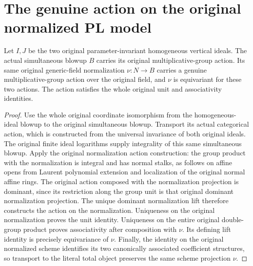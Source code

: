 \section{The genuine action on the original normalized PL model}

\begin{theorem}
\label{thm:pl-original-normalized-simultaneous-gm-action}
\leanok
Let $I,J$ be the two original parameter-invariant homogeneous vertical ideals.
The actual simultaneous blowup $B$ carries its original multiplicative-group
action. Its same original generic-field normalization $\nu:N\to B$ carries a
genuine multiplicative-group action over the original field, and $\nu$ is
equivariant for these two actions. The action satisfies the whole original
unit and associativity identities.
\end{theorem}
\begin{proof}
Use the whole original coordinate isomorphism from the homogeneous-ideal
blowup to the original simultaneous blowup. Transport its actual categorical
action, which is constructed from the universal invariance of both original
ideals. The original finite ideal logarithms supply integrality of this same
simultaneous blowup. Apply the original normalization action construction:
the group product with the normalization is integral and has normal stalks,
as follows on affine opens from Laurent polynomial extension and localization
of the original normal affine rings. The original action composed with the
normalization projection is dominant, since its restriction along the group
unit is that original dominant normalization projection. The unique dominant
normalization lift therefore constructs the action on the normalization.
Uniqueness on the original normalization proves the unit identity. Uniqueness
on the entire original double-group product proves associativity after
composition with $\nu$. Its defining lift identity is precisely equivariance
of $\nu$. Finally, the identity on the original normalized scheme identifies
its two canonically associated coefficient structures, so transport to the
literal total object preserves the same scheme projection $\nu$.
\end{proof}

